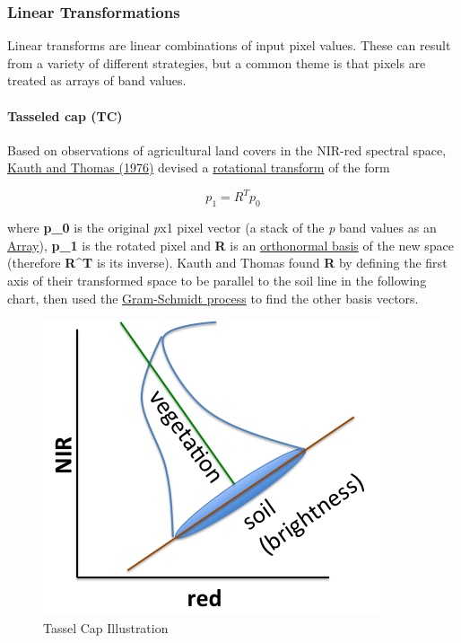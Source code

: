 \documentclass[
]{article}
\begin{document}
\hypertarget{linear-transformations}{%
\subsubsection{Linear Transformations}\label{linear-transformations}}

Linear transforms are linear combinations of input pixel values. These can result from a variety of different strategies, but a common theme is that pixels are treated as arrays of band values.

\hypertarget{tasseled-cap-tc}{%
\paragraph{Tasseled cap (TC)}\label{tasseled-cap-tc}}

Based on observations of agricultural land covers in the NIR-red spectral space, \href{http://citeseerx.ist.psu.edu/viewdoc/download?doi=10.1.1.461.6381\&rep=rep1\&type=pdf}{Kauth and Thomas (1976)} devised a \href{https://en.wikipedia.org/wiki/Change_of_basis}{rotational transform} of the form

\[p_1 = R^T p_0 \]

where \textbf{p\_0} is the original \emph{p}x1 pixel vector (a stack of the \emph{p} band values as an \href{https://developers.google.com/earth-engine/arrays_intro}{Array}), \textbf{p\_1} is the rotated pixel and \textbf{R} is an \href{https://en.wikipedia.org/wiki/Orthonormal_basis}{orthonormal basis} of the new space (therefore \textbf{R\^{}T} is its inverse). Kauth and Thomas found \textbf{R} by defining the first axis of their transformed space to be parallel to the soil line in the following chart, then used the \href{https://en.wikipedia.org/wiki/Gram–Schmidt_process}{Gram-Schmidt process} to find the other basis vectors.

\begin{figure}

{\centering \includegraphics[width=0.95\linewidth]{./im/im_04_02} 

}

\caption{Tassel Cap Illustration}\label{fig:tasselcap}
\end{figure}
\end{document}
